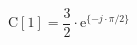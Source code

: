 \correct
\begin{center}
\[
\textrm{C}[1] = \frac{3}{2} \cdot \textrm{e}^{\{ -j \cdot \pi/2 \}}
\]
\end{center}

